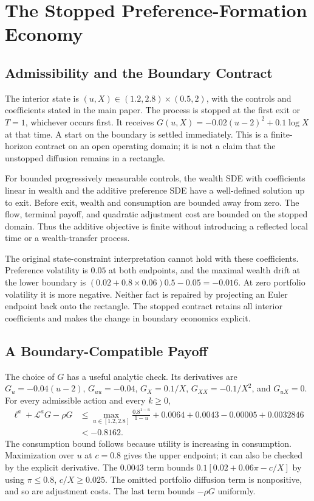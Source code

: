 \section{The Stopped Preference-Formation Economy}
\subsection{Admissibility and the Boundary Contract}
The interior state is $(u,X)\in(1.2,2.8)\times(0.5,2)$, with the controls and coefficients stated in the main paper. The process is stopped at the first exit or $T=1$, whichever occurs first. It receives $G(u,X)=-0.02(u-2)^2+0.1\log X$ at that time. A start on the boundary is settled immediately. This is a finite-horizon contract on an open operating domain; it is not a claim that the unstopped diffusion remains in a rectangle.

For bounded progressively measurable controls, the wealth SDE with coefficients linear in wealth and the additive preference SDE have a well-defined solution up to exit. Before exit, wealth and consumption are bounded away from zero. The flow, terminal payoff, and quadratic adjustment cost are bounded on the stopped domain. Thus the additive objective is finite without introducing a reflected local time or a wealth-transfer process.

The original state-constraint interpretation cannot hold with these coefficients. Preference volatility is $0.05$ at both endpoints, and the maximal wealth drift at the lower boundary is $(0.02+0.8\times0.06)0.5-0.05=-0.016$. At zero portfolio volatility it is more negative. Neither fact is repaired by projecting an Euler endpoint back onto the rectangle. The stopped contract retains all interior coefficients and makes the change in boundary economics explicit.

\subsection{A Boundary-Compatible Payoff}
The choice of $G$ has a useful analytic check. Its derivatives are $G_u=-0.04(u-2)$, $G_{uu}=-0.04$, $G_X=0.1/X$, $G_{XX}=-0.1/X^2$, and $G_{uX}=0$. For every admissible action and every $k\geq0$,
\begin{align*}
 \ell^a+\mathcal L^aG-\rho G
 &\leq \max_{u\in[1.2,2.8]}\frac{0.8^{1-u}}{1-u}
       +0.0064+0.0043-0.00005+0.0032846\\
 &<-0.8162.
\end{align*}
The consumption bound follows because utility is increasing in consumption. Maximization over $u$ at $c=0.8$ gives the upper endpoint; it can also be checked by the explicit derivative. The $0.0043$ term bounds $0.1[0.02+0.06\pi-c/X]$ by using $\pi\leq0.8$, $c/X\geq0.025$. The omitted portfolio diffusion term is nonpositive, and so are adjustment costs. The last term bounds $-\rho G$ uniformly.

